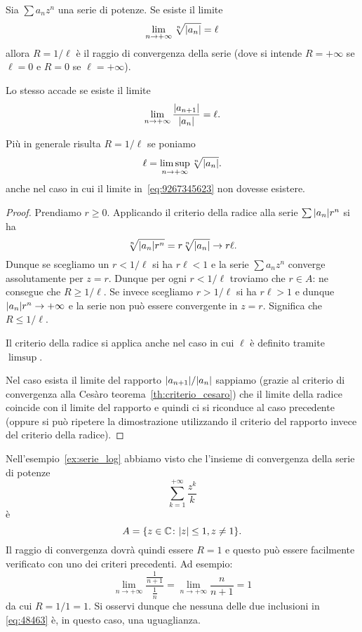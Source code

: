 \begin{theorem}
\mymark{***}
\label{th:calcolo_raggio_convergenza}
Sia $\sum a_n z^n$ una serie di potenze. Se esiste il limite
\begin{equation}\label{eq:9267345623}
  \lim_{n\to+\infty}\sqrt[n]{{\left|a_n\right|}} =\ell
\end{equation}
allora $R=1/\ell$ è il raggio di convergenza della serie
(dove si intende $R=+\infty$ se $\ell = 0$ e $R=0$ se $\ell=+\infty$).

Lo stesso accade se esiste il limite
\[
  \lim_{n\to +\infty} \frac{{\left|a_{n+1}\right|}}{{\left|a_n\right|}} = \ell.
\]

Più in generale risulta $R=1/\ell$ se poniamo
\[
   \ell = \limsup_{n\to +\infty} \sqrt[n]{{\left|a_n\right|}}.
\]
anche nel caso in cui il limite in~\eqref{eq:9267345623}
non dovesse esistere.
\end{theorem}
%
\begin{proof}
\mymark{***}
Prendiamo $r\ge 0$.
Applicando il criterio della radice alla serie $\sum {\left|a_n\right|} r^n$ si ha
\[
  \sqrt[n]{{\left|a_n\right|} r^n}
  = r \sqrt[n]{{\left|a_n\right|}} \to r\ell.
\]
Dunque se scegliamo un $r < 1/\ell$ si ha $r \ell<1$ e la serie
$\sum a_n z^n$ converge
assolutamente per $z=r$.
Dunque per ogni $r<1/\ell$
troviamo che $r\in A$: ne consegue che $R\ge 1/\ell$.
Se invece scegliamo $r > 1/\ell$ si ha $r \ell > 1$ e dunque
${\left|a_n\right|} r^n \to +\infty$ e la serie non può essere convergente
in $z=r$. Significa che $R\le 1/\ell$.

Il criterio della radice si applica anche nel caso in cui $\ell$ è definito
tramite $\limsup$.

Nel caso esista il limite del rapporto ${\left|a_{n+1}\right|} / {\left|a_n\right|}$
sappiamo (grazie al criterio di convergenza alla Cesàro teorema~\ref{th:criterio_cesaro}) che
il limite della radice coincide con il limite del rapporto e quindi
ci si riconduce al caso precedente (oppure si può ripetere la dimostrazione
utilizzando il criterio del rapporto invece del criterio della radice).
\end{proof}

\begin{example}
Nell'esempio~\ref{ex:serie_log} abbiamo visto
che l'insieme di convergenza della serie di potenze
\[
  \sum_{k=1}^{+\infty} \frac{z^k}{k}
\]
è
\[
  A = {\left\{  z\in {\mathbb C} \colon {\left|z\right|}\le 1, z\neq 1 \right\}}.
\]
Il raggio di convergenza dovrà quindi essere $R=1$ e questo può essere
facilmente verificato con uno dei criteri precedenti. Ad esempio:
\[
  \lim_{n\to+\infty} \frac{\frac{1}{n+1}}{\frac{1}{n}}
  = \lim_{n\to+\infty} \frac{n}{n+1} = 1
\]
da cui $R=1/1=1$.
Si osservi dunque che nessuna delle due inclusioni in \eqref{eq:48463}
è, in questo caso, una uguaglianza.
\end{example}

